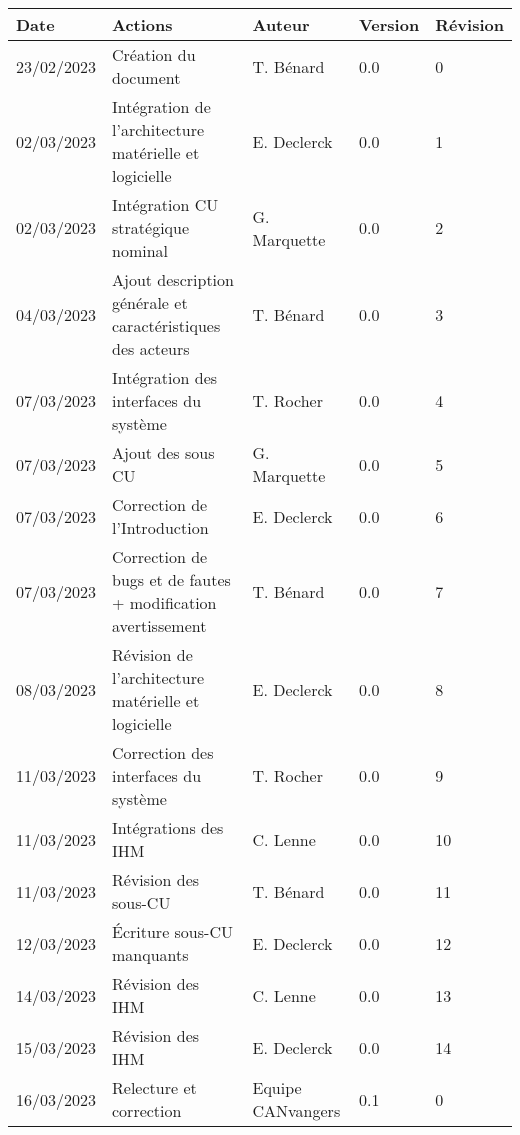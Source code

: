 %
%
\newpage %

\begin{longtable}[l]{|p{2cm}|p{6cm}|p{2.5cm}|p{1.5cm}|p{1.7cm}|}
    \hline
        \textbf{Date} & \textbf{Actions} & \textbf{Auteur} & \textbf{Version} & \textbf{Révision}\\
    \hline
        23/02/2023 & Création du document & T. Bénard & 0.0 & 0\\
    \hline
        02/03/2023 & Intégration de l'architecture \newline matérielle et logicielle & E. Declerck & 0.0 & 1\\
    \hline
        02/03/2023 & Intégration CU stratégique \newline nominal & G. Marquette & 0.0 & 2\\
    \hline
        04/03/2023 & Ajout description générale et \newline caractéristiques des acteurs & T. Bénard & 0.0 & 3\\
    \hline
        07/03/2023 & Intégration des interfaces du système & T. Rocher & 0.0 & 4\\
    \hline    
        07/03/2023 & Ajout des sous CU & G. Marquette & 0.0 & 5\\
    \hline
        07/03/2023 & Correction de l'Introduction & E. Declerck & 0.0 & 6\\
    \hline
        07/03/2023 & Correction de bugs et de fautes + modification avertissement & T. Bénard & 0.0 & 7\\
    \hline
        08/03/2023 & Révision de l'architecture matérielle et logicielle & E. Declerck & 0.0 & 8\\
    \hline
        11/03/2023 & Correction des interfaces du système & T. Rocher & 0.0 & 9\\
    \hline
        11/03/2023 & Intégrations des IHM & C. Lenne & 0.0 & 10\\
    \hline
        11/03/2023 & Révision des sous-CU & T. Bénard & 0.0 & 11\\
    \hline
        12/03/2023 & \'Ecriture sous-CU manquants & E. Declerck & 0.0 & 12\\
    \hline
        14/03/2023 & Révision des IHM & C. Lenne & 0.0 & 13\\
    \hline
        15/03/2023 & Révision des IHM & E. Declerck & 0.0 & 14\\
    \hline
        16/03/2023 & Relecture et correction & Equipe \newline CANvangers & 0.1 & 0\\

\end{longtable}
